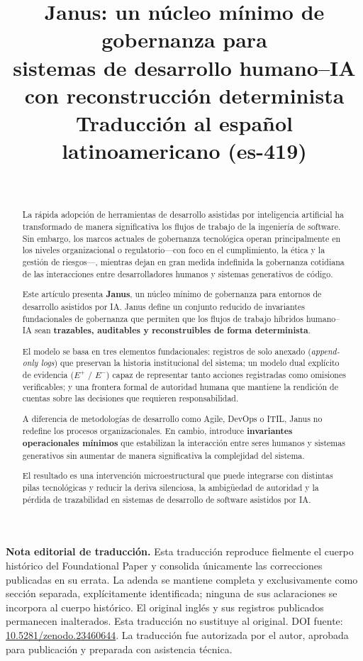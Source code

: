 \documentclass[conference]{IEEEtran}
\title{Janus: un núcleo mínimo de gobernanza para\\
sistemas de desarrollo humano--IA\\
con reconstrucción determinista\\[2mm]
\large Traducción al español latinoamericano (es-419)}
\author{\IEEEauthorblockN{Lic. Martín Nicolás Sánchez Morales}\\
\IEEEauthorblockA{Founder, Janus Governance Project\\Argentina\\
\url{https://janusgovernance.org}\\[1mm]
\textbf{v1.0.2-es-419 --- Traducción publicada}}}
\begin{document}
\maketitle

\noindent\textbf{Nota editorial de traducción.} Esta traducción reproduce fielmente el cuerpo histórico del Foundational Paper y consolida únicamente las correcciones publicadas en su errata. La adenda se mantiene completa y exclusivamente como sección separada, explícitamente identificada; ninguna de sus aclaraciones se incorpora al cuerpo histórico. El original inglés y sus registros publicados permanecen inalterados. Esta traducción no sustituye al original. DOI fuente: \href{https://doi.org/10.5281/zenodo.23460644}{10.5281/zenodo.23460644}. La traducción fue autorizada por el autor, aprobada para publicación y preparada con asistencia técnica.

\begin{abstract}
La rápida adopción de herramientas de desarrollo asistidas por inteligencia artificial ha transformado de manera significativa los flujos de trabajo de la ingeniería de software. Sin embargo, los marcos actuales de gobernanza tecnológica operan principalmente en los niveles organizacional o regulatorio---con foco en el cumplimiento, la ética y la gestión de riesgos---, mientras dejan en gran medida indefinida la gobernanza cotidiana de las interacciones entre desarrolladores humanos y sistemas generativos de código.

Este artículo presenta \textbf{Janus}, un núcleo mínimo de gobernanza para entornos de desarrollo asistidos por IA. Janus define un conjunto reducido de invariantes fundacionales de gobernanza que permiten que los flujos de trabajo híbridos humano--IA sean \textbf{trazables, auditables y reconstruibles de forma determinista}.

El modelo se basa en tres elementos fundacionales: registros de solo anexado (\textit{append-only logs}) que preservan la historia institucional del sistema; un modelo dual explícito de evidencia ($E^{+}$ / $E^{-}$) capaz de representar tanto acciones registradas como omisiones verificables; y una frontera formal de autoridad humana que mantiene la rendición de cuentas sobre las decisiones que requieren responsabilidad.

A diferencia de metodologías de desarrollo como Agile, DevOps o ITIL, Janus no redefine los procesos organizacionales. En cambio, introduce \textbf{invariantes operacionales mínimos} que estabilizan la interacción entre seres humanos y sistemas generativos sin aumentar de manera significativa la complejidad del sistema.

El resultado es una intervención microestructural que puede integrarse con distintas pilas tecnológicas y reducir la deriva silenciosa, la ambigüedad de autoridad y la pérdida de trazabilidad en sistemas de desarrollo de software asistidos por IA.
\end{abstract}
\end{document}
